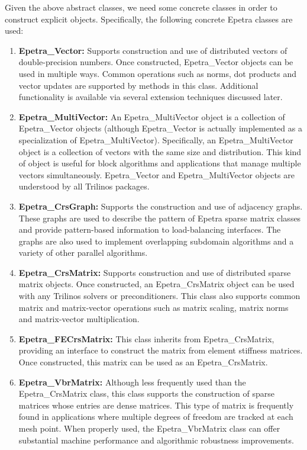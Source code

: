 \documentclass[12pt,relax]{AztecOOUserGuide}
\renewcommand{\vector}{Epetra\_Vector}
\newcommand{\multivector}{Epetra\_MultiVector}
\newcommand{\crsgraph}{Epetra\_CrsGraph}
\newcommand{\crsmatrix}{Epetra\_CrsMatrix}
\newcommand{\vbrmatrix}{Epetra\_VbrMatrix}
\newcommand{\fecrsmatrix}{Epetra\_FECrsMatrix}
\begin{document}
Given the above abstract classes, we need some concrete classes in
order to construct explicit objects.  Specifically,
the following concrete Epetra classes are used:
\begin{enumerate}
\item {\bf \vector{}: } Supports construction and use of distributed
vectors of double-precision numbers.  Once constructed, \vector{}
objects can be used in multiple ways.  Common operations such as
norms, dot products and vector updates are supported by methods in
this class.  Additional functionality is available via several
extension techniques discussed later.
\item{\bf \multivector{}: } An \multivector{} object is a collection
of \vector{} objects (although \vector{} is actually implemented as a
specialization of \multivector{}).  Specifically, an \multivector{}
object is a collection of vectors with the same size and
distribution.  This kind of object is useful for block algorithms and
applications that manage multiple vectors simultaneously.  \vector{}
and \multivector{} objects are understood by all Trilinos packages.
\item{\bf \crsgraph{}:} Supports the construction and use of adjacency
graphs.  These graphs are used to describe the pattern of Epetra
sparse matrix classes and provide pattern-based information to
load-balancing interfaces.  The graphs are also used to implement
overlapping subdomain algorithms and a variety of other parallel
algorithms.
\item{\bf \crsmatrix{}:} Supports construction and use of distributed
sparse matrix objects.  Once constructed, an \crsmatrix{} object can
be used with any Trilinos solvers or preconditioners.  This class also
supports common matrix and matrix-vector operations such as matrix
scaling, matrix norms and matrix-vector multiplication.
\item{\bf \fecrsmatrix{}:} This class inherits from \crsmatrix,
providing an interface to construct the matrix from element stiffness
matrices.  Once constructed, this matrix can be used as an \crsmatrix{}.
\item{\bf \vbrmatrix{}:} Although less frequently used than the
\crsmatrix{} class, this class supports the construction of sparse
matrices whose entries are dense matrices.  This type of matrix is
frequently found in applications where multiple degrees of freedom are
tracked at each mesh point.  When properly used, the \vbrmatrix{}
class can offer substantial machine performance and algorithmic
robustness improvements.

\end{enumerate}
\end{document}
